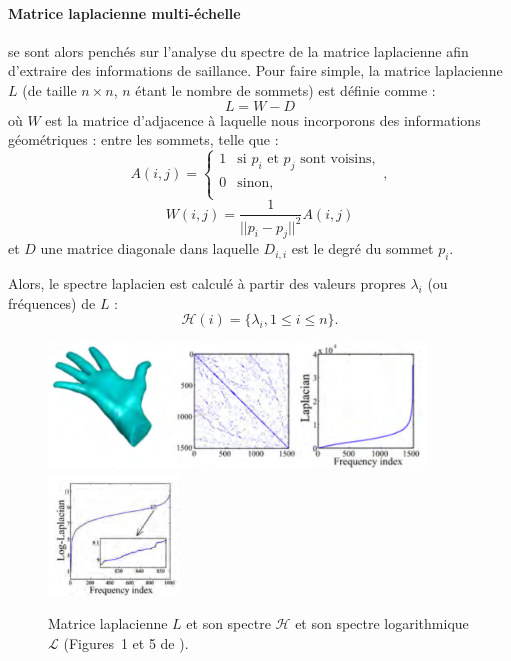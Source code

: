 \paragraph{Matrice laplacienne multi-échelle}
 se sont alors penchés sur l'analyse du spectre de la matrice laplacienne afin d'extraire des informations de saillance.
Pour faire simple, la matrice laplacienne $L$ (de taille $n \times n$, $n$ étant le nombre de sommets) est définie comme :
\begin{equation}
  L = W - D
\end{equation}
où $W$ est la matrice d’adjacence à laquelle nous incorporons des informations géométriques : entre les sommets, telle que :
\begin{equation}
  A(i,j) =
  \begin{cases}
    1   & \text{si } p_i \text{ et } p_j \text{ sont voisins},\\
    0   & \text{sinon},\\
  \end{cases},
\end{equation}
\begin{equation}
  W(i,j) = \frac{1}{{||p_i - p_j||}^2}A(i,j)
\end{equation}
et $D$ une matrice diagonale dans laquelle $D_{i,i}$ est le degré du sommet $p_i$.

Alors, le spectre laplacien est calculé à partir des valeurs propres $\lambda_i$ (ou fréquences) de $L$ :
\begin{equation}
  \mathcal{H}(i) = \{ \lambda_i, 1 \le i \le n \}.
\end{equation}

\begin{figure}[ht]{
    \begin{center}
    \includegraphics[width=10cm]{images/Feature/LaplacianSpectrum}
    \includegraphics[width=3.5cm]{images/Feature/LaplacianSpectrumLog}
    \end{center}}
    \caption[Matrice laplacienne et son spectre.]{Matrice laplacienne $L$ et son spectre $\mathcal{H}$ et son spectre logarithmique $\mathcal{L}$ (Figures~1 et 5 de \cite{Song2014}).
      \label{fig:laplacian-spectrum}}
\end{figure}

